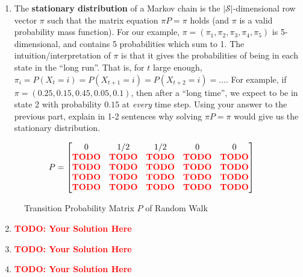 \documentclass[12pt]{article}
\def\todo#1{\textcolor{red}{\textbf{#1}}}
\renewcommand{\|}{\mid}
\begin{document}
\begin{enumerate}
\begin{enumerate}
    \item The \textbf{stationary distribution} of a Markov chain is the $|\mathcal{S}|$-dimensional row vector $\pi$ such that the matrix equation $\pi P=\pi$ holds (and $\pi$ is a valid probability mass function). For our example, $\pi=(\pi_1,\pi_2,\pi_3,\pi_4,\pi_5)$ is 5-dimensional, and contains 5 probabilities which sum to 1. The intuition/interpretation of $\pi$ is that it gives the probabilities of being in each state in the ``long run''. That is, for $t$ large enough, $\pi_i=P(X_t=i)=P(X_{t+1}=i)=P(X_{t+2}=i)=\dots$. For example, if $\pi=(0.25, 0.15, 0.45, 0.05, 0.1)$, then after a ``long time'', we expect to be in state 2 with probability $0.15$ at \textit{every} time step. Using your answer to the previous part, explain in 1-2 sentences why solving $\pi P=\pi$ would give us the stationary distribution. 

\end{enumerate}

\begin{figure}[h]
\caption{Transition Probability Matrix $P$ of Random Walk}
$$P=\begin{bmatrix}
0 & 1/2 & 1/2 & 0 & 0 \\
\todo{TODO} & \todo{TODO} & \todo{TODO} & \todo{TODO} & \todo{TODO} \\
\todo{TODO} & \todo{TODO} & \todo{TODO} & \todo{TODO} & \todo{TODO} \\
\todo{TODO} & \todo{TODO} & \todo{TODO} & \todo{TODO} & \todo{TODO} \\
\todo{TODO} & \todo{TODO} & \todo{TODO} & \todo{TODO} & \todo{TODO} \\
\end{bmatrix}$$
\end{figure}
\begin{tcolorbox}
\begin{enumerate}
\setcounter{enumii}{1}
\item \todo{TODO: Your Solution Here}
\item \todo{TODO: Your Solution Here}
\item \todo{TODO: Your Solution Here}
\end{enumerate}
\end{tcolorbox}

\newpage


\end{enumerate}
\end{document}
